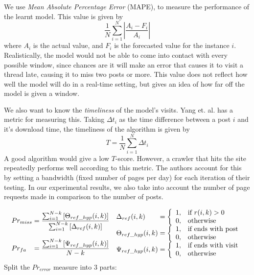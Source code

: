 We use \emph{Mean Absolute Percentage Error} (MAPE), to measure the performance 
of the learnt model. This value is given by
\[
	\frac{1}{N}\sum^N_{i=1}\left|\frac{A_i-F_i}{A_i}\right|
\]
where $A_i$ is the actual value, and $F_i$ is the forecasted value for the 
instance $i$. Realistically, the model would not be able to come into contact 
with every possible window, since chances are it will make an error that causes 
it to visit a thread late, causing it to miss two posts or more. This value does 
not reflect how well the model will do in a real-time setting, but gives an idea 
of how far off the model is given a window. 

We also want to know the \emph{timeliness} of the model's visits. Yang et. al.  
\cite{Yang2009} has a metric for measuring this. Taking $\Delta t_i$ as the time 
difference between a post $i$ and it's download time, the timeliness of the 
algorithm is given by
\[T = \frac{1}{N} \sum^{N}_{i=1}\Delta t_i\]
A good algorithm would give a low $T$-score. However, a crawler that hits the 
site repeatedly performs well according to this metric. The authors account for 
this by setting a bandwidth (fixed number of pages per day) for each iteration 
of their testing. In our experimental results, we also take into account the 
number of page requests made in comparison to the number of posts. %

\begin{align*}
	\begin{array}{l@{\mskip\thickmuskip}l}
	Pr_{miss} &=  \dfrac{%
		\sum^{N-k}_{i=1} \left[\Theta_{ref\_hyp} (i,k)\right]%
	}{%
		\sum^{N-k}_{i=1} \left[\Delta_{ref} (i,k)\right]%
	}\\
	 & \\
	Pr_{fa} &= \dfrac{%
		\sum^{N-k}_{i=1} \left[\Psi_{ref\_hyp} (i,k)\right]%
	}{N-k}
	\end{array}
	\begin{array}{l@{\mskip\thickmuskip}l}
		\Delta_{ref}(i,k) &= \left\{ \begin{array}{l l}
				1, & \text{if }r(i,k) > 0 \\
				0, & \text{otherwise} 
		\end{array} \right.\\
		\Theta_{ref\_hyp}(i,k) &= \left\{ \begin{array}{l l}
				1, & \text{if ends with post} \\
				0, & \text{otherwise} 
		\end{array} \right.\\
		\Psi_{ref\_hyp}(i,k) &= \left\{ \begin{array}{l l}
				1, & \text{if ends with visit}\\
				0, & \text{otherwise} 
		\end{array} \right.\\
	\end{array}
\end{align*}
Split the $Pr_{error}$ measure into 3 parts:

